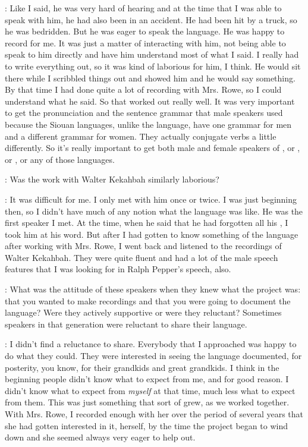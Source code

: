 \documentclass[output=paper]{LSP/langsci}
\begin{document}
: Like I said, he was very hard of hearing and at the time that I was able to speak with him, he had also been in an accident. He had been hit by a truck, so he was bedridden. But he was eager to speak the  language. He was happy to record for me. It was just a matter of interacting with him, not being able to speak to him directly and have him understand most of what I said. I really had to write everything out, so it was kind of laborious for him, I think. He would sit there while I scribbled things out and showed him and he would say something. By that time I had done quite a lot of recording with Mrs. Rowe, so I could understand what he said. So that worked out really well. It was very important to get the pronunciation and the sentence grammar that male speakers used because the Siouan languages, unlike the  language, have one grammar for men and a different grammar for women. They actually conjugate verbs a little differently. So it's really important to get both male and female speakers of , or , or , or  any of those languages.

: Was the work with Walter Kekahbah similarly laborious?

: It was difficult for me. I only met with him once or twice. I was just beginning then, so I didn't have much of any notion what the  language was like. He was the first  speaker I met. At the time, when he said that he had forgotten all his , I took him at his word. But after I had gotten to know something of the language after working with Mrs. Rowe, I went back and listened to the recordings of Walter Kekahbah. They were quite fluent and had a lot of the male speech features that I was looking for in Ralph Pepper's speech, also.

: What was the attitude of these  speakers when they knew what the project was: that you wanted to make recordings and that you were going to document the language? Were they actively supportive or were they reluctant? Sometimes speakers in that generation were reluctant to share their language.

: I didn't find a reluctance to share. Everybody that I approached was happy to do what they could. They were interested in seeing the language documented, for posterity, you know, for their grandkids and great grandkids. I think in the beginning people didn't know what to expect from me, and for good reason. I didn't know what to expect from \textit{myself} at that time, much less what to expect from them. This was just something that sort of grew, as we worked together. With Mrs. Rowe, I recorded enough with her over the period of several years that she had gotten interested in it, herself, by the time the project began to wind down and she seemed always very eager to help out.
\end{document}
